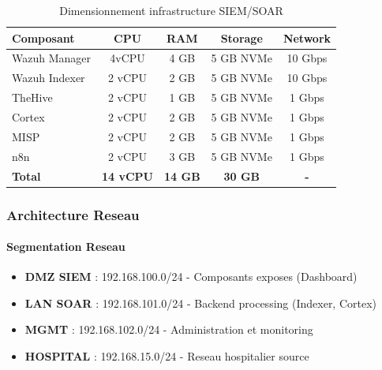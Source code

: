 \begin{table}[H]
    \centering
    \caption{Dimensionnement infrastructure SIEM/SOAR}
    \begin{tabular}{|l|c|c|c|c|}
        \hline
        \textbf{Composant} & \textbf{CPU}     & \textbf{RAM}   & \textbf{Storage} & \textbf{Network} \\
        \hline
        Wazuh Manager      & 4vCPU            & 4 GB           & 5 GB NVMe        & 10 Gbps          \\
        \hline
        Wazuh Indexer      & 2 vCPU           & 2 GB           & 5 GB NVMe        & 10 Gbps          \\
        \hline
        TheHive            & 2 vCPU           & 1 GB           & 5 GB NVMe        & 1 Gbps           \\
        \hline
        Cortex             & 2 vCPU           & 2 GB           & 5 GB NVMe        & 1 Gbps           \\
        \hline
        MISP               & 2 vCPU           & 2 GB           & 5 GB NVMe        & 1 Gbps           \\
        \hline
        n8n                & 2 vCPU           & 3 GB           & 5 GB NVMe        & 1 Gbps           \\
        \hline
        \textbf{Total}     & \textbf{14 vCPU} & \textbf{14 GB} & \textbf{30 GB}   & \textbf{-}       \\
        \hline
    \end{tabular}
\end{table}

\subsubsection{Architecture Reseau}

\paragraph{Segmentation Reseau}
\begin{itemize}
    \item \textbf{DMZ SIEM} : 192.168.100.0/24 - Composants exposes (Dashboard)
    \item \textbf{LAN SOAR} : 192.168.101.0/24 - Backend processing (Indexer, Cortex)
    \item \textbf{MGMT} : 192.168.102.0/24 - Administration et monitoring
    \item \textbf{HOSPITAL} : 192.168.15.0/24 - Reseau hospitalier source
\end{itemize}

